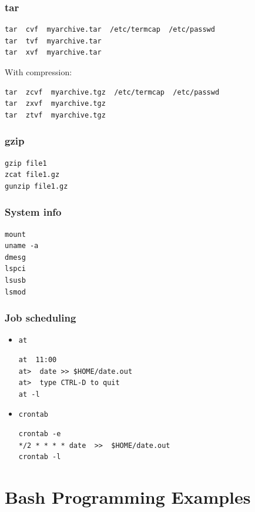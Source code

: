 \documentclass[12pt]{article}
\begin{document}
\subsubsection{tar}
\label{sec-2-10-9}
\begin{verbatim}
tar  cvf  myarchive.tar  /etc/termcap  /etc/passwd
tar  tvf  myarchive.tar
tar  xvf  myarchive.tar
\end{verbatim}
With compression:
\begin{verbatim}
tar  zcvf  myarchive.tgz  /etc/termcap  /etc/passwd
tar  zxvf  myarchive.tgz
tar  ztvf  myarchive.tgz
\end{verbatim}

\subsubsection{gzip}
\label{sec-2-10-10}
\begin{verbatim}
gzip file1
zcat file1.gz
gunzip file1.gz
\end{verbatim}

\subsubsection{System info}
\label{sec-2-10-11}
\begin{verbatim}
mount
uname -a
dmesg
lspci
lsusb
lsmod
\end{verbatim}

\subsubsection{Job scheduling}
\label{sec-2-10-12}
\begin{itemize}
\item \texttt{at}
\begin{verbatim}
at  11:00
at>  date >> $HOME/date.out
at>  type CTRL-D to quit
at -l
\end{verbatim}
\item \texttt{crontab}
\begin{verbatim}
crontab -e
*/2 * * * * date  >>  $HOME/date.out
crontab -l
\end{verbatim}
\end{itemize}
\section{Bash Programming Examples}
\label{sec-3}
\end{document}
